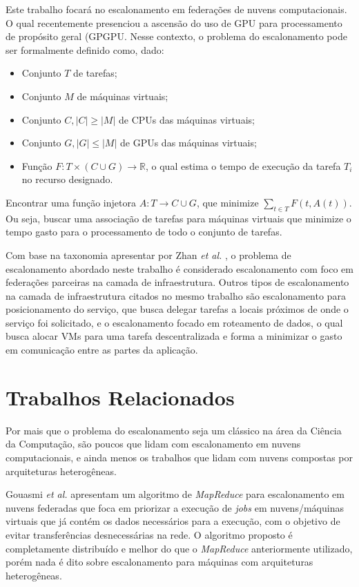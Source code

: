 Este trabalho focará no escalonamento em federações de nuvens computacionais. O qual recentemente presenciou a ascensão do uso de \acrfull{GPU} para processamento de propósito geral (\acrfull{GPGPU}\cite{Dimitrov:2009:USA:1513895.1513907}\cite{Yang:2010:GCM:1809028.1806606}. Nesse contexto, o problema do escalonamento pode ser formalmente definido como, dado:

\begin{itemize}
	\item Conjunto $T$ de tarefas;
	\item Conjunto $M$ de máquinas virtuais;
	\item Conjunto $C, |C| \ge |M|$ de CPUs das máquinas virtuais;
	\item Conjunto $G,  |G| \le |M|$ de GPUs das máquinas virtuais;
	\item Função $F: T \times (C \cup G) \to \mathbb{R}$, o qual estima o tempo de execução da tarefa $T_{i}$ no recurso designado.
\end{itemize}
Encontrar uma função injetora $A: T \to C \cup G$, que minimize $\sum_{t \in T} F(t, A(t) )$. Ou seja, buscar uma associação de tarefas para máquinas virtuais que minimize o tempo gasto para o processamento de todo o conjunto de tarefas.

Com base na taxonomia apresentar por Zhan \textit{et al.} \cite{Zhan:2015:CCR:2775083.2788397}, o problema de escalonamento abordado neste trabalho é considerado escalonamento com foco em federações parceiras na camada de infraestrutura. Outros tipos de escalonamento na camada de infraestrutura citados no mesmo trabalho são escalonamento para posicionamento do serviço, que busca delegar tarefas a locais próximos de onde o serviço foi solicitado, e o escalonamento focado em roteamento de dados, o qual busca alocar \acrshort{VM}s para uma tarefa descentralizada e forma a minimizar o gasto em comunicação entre as partes da aplicação.

\section{Trabalhos Relacionados}

Por mais que o problema do escalonamento seja um clássico na área da Ciência da Computação, são poucos que lidam com escalonamento em nuvens computacionais, e ainda menos os trabalhos que lidam com nuvens compostas por arquiteturas heterogêneas. 

Gouasmi \textit{et al.} \cite{MapReduce_sched_8034997} apresentam um algoritmo de \textit{MapReduce}\cite{Dean:2008:MSD:1327452.1327492} para escalonamento em nuvens federadas que foca em priorizar a execução de \textit{jobs} em nuvens/máquinas virtuais que já contém os dados necessários para a execução, com o objetivo de evitar transferências desnecessárias na rede. O algoritmo proposto é completamente distribuído e melhor do que o \textit{MapReduce} anteriormente utilizado, porém nada é dito sobre escalonamento para máquinas com arquiteturas heterogêneas.

